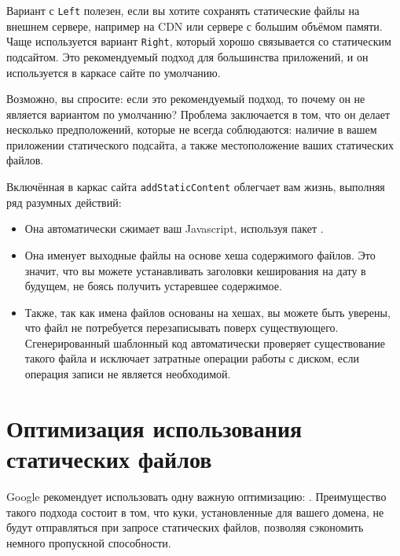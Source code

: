 Вариант с \lstinline!Left! полезен, если вы хотите сохранять статические файлы
на внешнем сервере, например на CDN или сервере с большим объёмом памяти. Чаще
используется вариант \lstinline!Right!, который хорошо связывается со
статическим подсайтом. Это рекомендуемый подход для большинства приложений, и
он используется в каркасе сайте по умолчанию.

\begin{remark}
    Возможно, вы спросите: если это рекомендуемый подход, то почему он не
    является вариантом по умолчанию? Проблема заключается в том, что он делает
    несколько предположений, которые не всегда соблюдаются: наличие в вашем
    приложении статического подсайта, а также местоположение ваших статических
    файлов.
\end{remark}

Включённая в каркас сайта \lstinline!addStaticContent! облегчает вам жизнь,
выполняя ряд разумных действий:
\begin{itemize}
  \item Она автоматически сжимает ваш Javascript, используя пакет
      .

  \item Она именует выходные файлы на основе хеша содержимого файлов. Это
      значит, что вы можете устанавливать заголовки кеширования на дату в
      будущем, не боясь получить устаревшее содержимое.

  \item Также, так как имена файлов основаны на хешах, вы можете быть уверены,
      что файл не потребуется перезаписывать поверх существующего.
      Сгенерированный шаблонный код автоматически проверяет существование
      такого файла и исключает затратные операции работы с диском, если
      операция записи не является необходимой.
\end{itemize}

\section {Оптимизация использования статических файлов}

Google рекомендует использовать одну важную оптимизацию:
.
Преимущество такого подхода состоит в том, что куки, установленные для вашего
домена, не будут отправляться при запросе статических файлов, позволяя
сэкономить немного пропускной способности.

